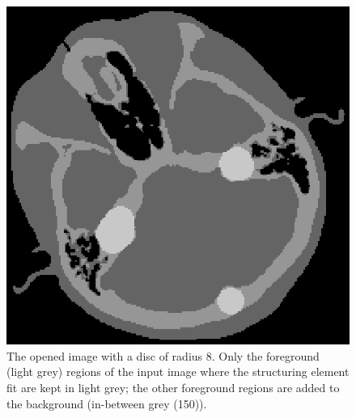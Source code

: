 \documentclass{InsightArticle}
\begin{document}
\begin{figure}
\centering
\includegraphics{open.eps}
\caption{The opened image with a disc of radius 8. Only the foreground (light grey) regions of the input image where the structuring element fit are kept in light grey; the other foreground regions are added to the background (in-between grey (150)).\label{open}}
\end{figure}
\end{document}
